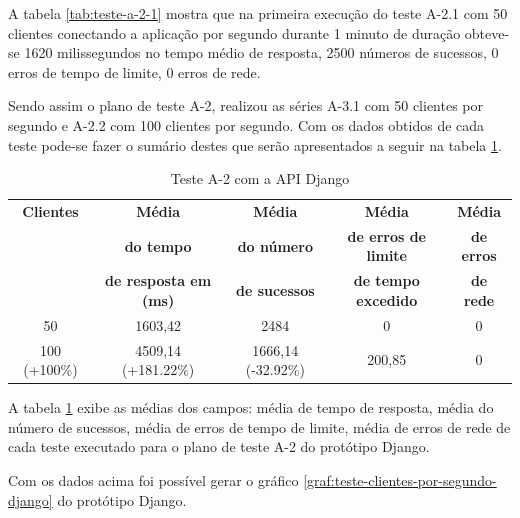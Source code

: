  A tabela \ref{tab:teste-a-2-1} mostra que na primeira execução do teste A-2.1 com 50 clientes conectando a aplicação por segundo
  durante 1 minuto de duração obteve-se 1620 milissegundos no tempo médio de resposta,
  2500 números de sucessos, 0 erros de tempo de limite, 0 erros de rede.

  Sendo assim o plano de teste A-2, realizou as séries A-3.1 com 50 clientes por segundo e A-2.2 com 100 clientes por segundo.
  Com os dados obtidos de cada teste pode-se fazer o sumário destes que serão apresentados
  a seguir na tabela \ref{tab:sumario-resultado-plano-teste-a-2}.

  \begin{table}[H]
    \centering
    \footnotesize
    \setlength{\abovecaptionskip}{0pt}
    \setlength{\belowcaptionskip}{0pt}
    \caption[Teste A-2 com a API Django]{Teste A-2 com a API Django}
    \label{tab:sumario-resultado-plano-teste-a-2}
    \begin{tabular}{c|c|c|c|c}
      \hline \hline
      \textbf{Clientes} & \textbf{Média} &	\textbf{Média} & \textbf{Média} & \textbf{Média}  \\
      {}		& \textbf{do tempo} &   \textbf{do número } & \textbf{de erros de limite} & \textbf{de erros}  \\
      {}		& \textbf{de resposta em (ms) } &\textbf{de sucessos } & \textbf{de tempo excedido} & \textbf{de rede} \\
      \hline \hline
      50 &			1603,42 & 				2484 & 					0 &					0 \\
      100 (+100\%)&		4509,14 (+181.22\%) & 			1666,14 (-32.92\%) & 			200,85  &				0 \\
      \hline \hline
    \end{tabular}
  \end{table}

  A tabela \ref{tab:sumario-resultado-plano-teste-a-2} exibe as médias dos campos: média de tempo de resposta,
  média do número de sucessos, média de erros de tempo de limite, média de erros de rede de cada teste executado
  para o plano de teste A-2 do protótipo Django.

  Com os dados acima foi possível gerar o gráfico \ref{graf:teste-clientes-por-segundo-django} do
  protótipo Django.

